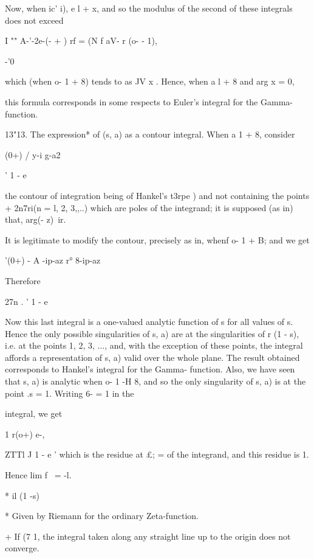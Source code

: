 %
%

Now, when ic' i), e l + x, and so the modulus of the second of these
integrals does not exceed

I "" A-'-2e-(- + ) rf = (N f aV- r (o- - 1),

-'0

which (when o- 1 + 8) tends to as JV x . Hence, when a l + 8 and arg x
= 0,

this formula corresponds in some respects to Euler's integral for the
Gamma- function.

13"13. The expression* of (s, a) as a contour integral. When a 1 + 8,
consider

(0+) / y-i g-a2

' 1 - e

the contour of integration being of Hankel's t3rpe ) and not
containing the points + 2n7ri(n = l, 2, 3,,..) which are poles of the
integrand; it is supposed (as in) that, arg(- z)\ ir.

It is legitimate to modify the contour, precisely as in, whenf
o- 1 + B; and we get

'(0+) - A -ip-az r° 8-ip-az

Therefore

27n . ' 1 - e

Now this last integral is a one-valued analytic function of s for all
values of s. Hence the only possible singularities of s, a) are at the
singularities of r (1 - s), i.e. at the points 1, 2, 3, ..., and, with
the exception of these points, the integral affords a representation
of s, a) valid over the whole plane. The result obtained corresponds
to Hankel's integral for the Gamma- function. Also, we have seen that
s, a) is analytic when o- 1 -H 8, and so the only singularity of s, a)
is at the point .s = 1. Writing 6- = 1 in the

integral, we get

1 r(o+) e-,

ZTTl J 1 - e ' which is the residue at £; = of the integrand, and this
residue is 1.

Hence lim f \ = -l.

* il (1 -s)

* Given by Riemann for the ordinary Zeta-function.

+ If (7 1, the integral taken along any straight line up to the origin
does not converge.

%
%


